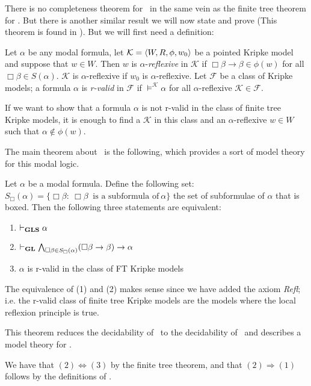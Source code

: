 \documentclass[../main.tex]{subfiles}
\begin{document}
There is no completeness theorem for \GLS\ in the same vein as the finite tree
theorem for \GL. But there is another similar result we will now state and
prove (This theorem is found in \parencite{Lind1997}). But we will first need a
definition:
\begin{defi}
	Let $\alpha$ be any modal formula, let $\mathcal{K}=\langle
W,R,\phi,w_0\rangle$ be a pointed Kripke model and suppose that $w\in W$.
Then $w$ is $\alpha$-\textit{reflexive} in $\mathcal{K}$ if
$\Box\beta\rightarrow\beta\in\phi(w)$ for all $\Box\beta\in S(\alpha)$.
$\mathcal{K}$ is $\alpha$-reflexive if $w_0$ is $\alpha$-reflexive. Let
$\mathcal{F}$ be a class of Kripke models; a formula $\alpha$ is
\textit{r-valid} in $\mathcal{F}$ if $\vDash^\mathcal{K}\alpha$ for all
$\alpha$-reflexive $\mathcal{K}\in\mathcal{F}$.
\end{defi}

If we want to show that a formula $\alpha$ is not r-valid in the class of
finite tree Kripke models, it is enough to find a $\mathcal{K}$ in this class
and an $\alpha$-reflexive $w\in W$ such that $\alpha\not\in\phi(w)$.

The main theorem about \GLS\ is the following, which provides a sort of
model theory for this modal logic. 

\begin{thm}
	\label{thm:MainGLS}
	Let $\alpha$ be a modal formula. Define the following set: $S_\Box(\alpha)=\{\Box\beta:\
	\Box\beta\ \text{ is a subformula of}\ \alpha\}$ the set of
	subformulae of $\alpha$ that is boxed. Then the following three
	statements are equivalent:
	\begin{enumerate}
		\item $\vdash_{\text{\textbf{GLS}}}\alpha$
		\item $\vdash_{\text{\textbf{GL}}}\bigwedge_{\Box\beta\in
			S_\Box(\alpha)}(\Box\beta\rightarrow\beta)\rightarrow\alpha$
		\item $\alpha$ is r-valid in the class of FT Kripke
			models
	\end{enumerate}
\end{thm}
The equivalence of (1) and (2) makes sense since we have added the axiom
\textit{Refl}; i.e.
the r-valid class of finite tree Kripke models are the models where the local
reflexion principle is true.

This theorem reduces the decidability of \GLS\ to the decidability of \GL\ and
describes a model theory for \GLS.

	We have that $(2)\Leftrightarrow(3)$ by the finite tree theorem, and
	that $(2)\Rightarrow(1)$  follows by the definitions of \GLS.
\end{document}

